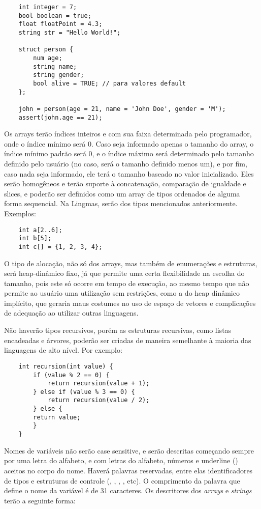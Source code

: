 \begin{lstlisting}
    int integer = 7;
    bool boolean = true;
    float floatPoint = 4.3;
    string str = "Hello World!";

    struct person {
        num age;
        string name;
        string gender;
        bool alive = TRUE; // para valores default
    };

    john = person(age = 21, name = 'John Doe', gender = 'M');
    assert(john.age == 21);
\end{lstlisting}

Os arrays terão índices inteiros e com sua faixa determinada pelo programador,
onde o índice mínimo será 0. Caso seja informado apenas o tamanho do array, o
índice mínimo padrão será 0, e o índice máximo será determinado pelo tamanho
definido pelo usuário (no caso, será o tamanho definido menos um), e por fim,
caso nada seja informado, ele terá o tamanho baseado no valor inicializado.
Eles serão homogêneos e terão suporte à concatenação, comparação de igualdade e
slices, e poderão ser definidos como um array de tipos ordenados de alguma
forma sequencial. Na Lingmas, serão dos tipos mencionados anteriormente.
Exemplos:

\begin{lstlisting}
    int a[2..6];
    int b[5];
    int c[] = {1, 2, 3, 4};
\end{lstlisting}


O tipo de alocação, não só dos arrays, mas também de enumerações e estruturas,
será heap-dinâmico fixo, já que permite uma certa flexibilidade na escolha do
tamanho, pois este só ocorre em tempo de execução, ao mesmo tempo que não
permite ao usuário uma utilização sem restrições, como a do heap dinâmico
implícito, que geraria maus costumes no uso de espaço de vetores e complicações
de adequação ao utilizar outras linguagens.

Não haverão tipos recursivos, porém as estruturas recursivas, como listas
encadeadas e árvores, poderão ser criadas de maneira semelhante à maioria das
linguagens de alto nível. Por exemplo:

\begin{lstlisting}
    int recursion(int value) {
        if (value % 2 == 0) {
            return recursion(value + 1);
        } else if (value % 3 == 0) {
            return recursion(value / 2);
        } else {
        return value;
        }
    }
\end{lstlisting}

Nomes de variáveis não serão case sensitive, e serão descritas começando sempre
por uma letra do alfabeto, e com letras do alfabeto, números e underline
(\ic{_}) aceitos no corpo do nome. Haverá palavras reservadas, entre elas
identificadores de tipos e estruturas de controle (, ,
, , etc). O comprimento da palavra que define o nome da
variável é de 31 caracteres. Os descritores dos \emph{arrays} e \emph{strings}
terão a seguinte forma:

